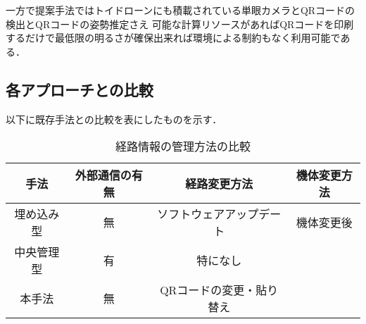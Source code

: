 一方で提案手法ではトイドローンにも積載されている単眼カメラとQRコードの検出とQRコードの姿勢推定さえ
可能な計算リソースがあればQRコードを印刷するだけで最低限の明るさが確保出来れば環境による制約もなく利用可能である．

\subsection{各アプローチとの比較}
以下に既存手法との比較を表にしたものを示す．

\begin{table}[h]
    \caption{各自己位置推定手法との比較}
    \label{table:compare_localization}
    \centering
\end{table}

\begin{table}[h]
    \caption{経路情報の管理方法の比較}
    \label{table:compare_route_info}
    \centering
    \begin{tabular}{cccc}
        \hline
        手法 & 外部通信の有無 & 経路変更方法 & 機体変更方法 \\
        \hline \hline
        埋め込み型 & 無 & ソフトウェアアップデート & 機体変更後\\
        中央管理型 & 有 & 特になし &  \\
        本手法 & 無 & QRコードの変更・貼り替え &  \\
        \hline
    \end{tabular}
\end{table}
